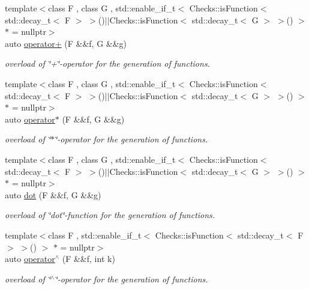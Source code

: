 \begin{DoxyCompactItemize}
{\footnotesize template$<$class F , class G , std\-::enable\-\_\-if\-\_\-t$<$ Checks\-::is\-Function$<$ std\-::decay\-\_\-t$<$ F $>$ $>$()$\vert$$\vert$\-Checks\-::is\-Function$<$ std\-::decay\-\_\-t$<$ G $>$ $>$() $>$ $\ast$  = nullptr$>$ }\\auto \hyperlink{namespaceFunG_a24bb5d609b022030afda2d8589cf5509}{operator+} (F \&\&f, G \&\&g)
\begin{DoxyCompactList}\small\item\em overload of \char`\"{}+\char`\"{}-\/operator for the generation of functions. \end{DoxyCompactList}\item 
{\footnotesize template$<$class F , class G , std\-::enable\-\_\-if\-\_\-t$<$ Checks\-::is\-Function$<$ std\-::decay\-\_\-t$<$ F $>$ $>$()$\vert$$\vert$\-Checks\-::is\-Function$<$ std\-::decay\-\_\-t$<$ G $>$ $>$() $>$ $\ast$  = nullptr$>$ }\\auto \hyperlink{namespaceFunG_a267562e725c73ece1c1d057b5f29511f}{operator$\ast$} (F \&\&f, G \&\&g)
\begin{DoxyCompactList}\small\item\em overload of \char`\"{}$\ast$\char`\"{}-\/operator for the generation of functions. \end{DoxyCompactList}\item 
{\footnotesize template$<$class F , class G , std\-::enable\-\_\-if\-\_\-t$<$ Checks\-::is\-Function$<$ std\-::decay\-\_\-t$<$ F $>$ $>$()$\vert$$\vert$\-Checks\-::is\-Function$<$ std\-::decay\-\_\-t$<$ G $>$ $>$() $>$ $\ast$  = nullptr$>$ }\\auto \hyperlink{namespaceFunG_ac73eb907f3d29a9ea60513a43c658270}{dot} (F \&\&f, G \&\&g)
\begin{DoxyCompactList}\small\item\em overload of \char`\"{}dot\char`\"{}-\/function for the generation of functions. \end{DoxyCompactList}\item 
{\footnotesize template$<$class F , std\-::enable\-\_\-if\-\_\-t$<$ Checks\-::is\-Function$<$ std\-::decay\-\_\-t$<$ F $>$ $>$() $>$ $\ast$  = nullptr$>$ }\\auto \hyperlink{namespaceFunG_a94273e3ea80324e591bb98ae3c051221}{operator$^\wedge$} (F \&\&f, int k)
\begin{DoxyCompactList}\small\item\em overload of \char`\"{}$^\wedge$\char`\"{}-\/operator for the generation of functions. \end{DoxyCompactList}\item 

\end{DoxyCompactItemize}
